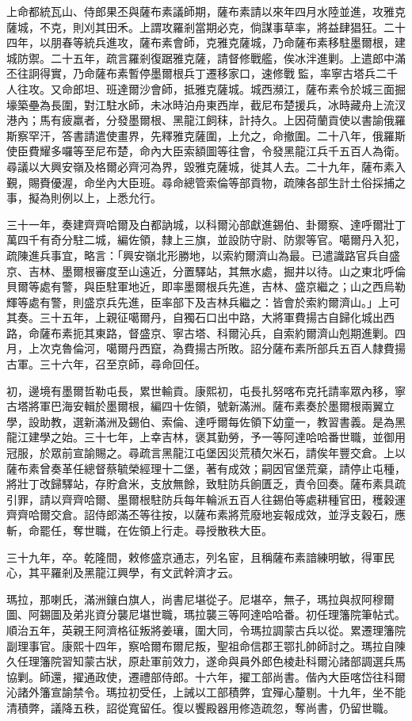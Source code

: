 \begin{pinyinscope}
上命都統瓦山、侍郎果丕與薩布素議師期，薩布素請以來年四月水陸並進，攻雅克薩城，不克，則刈其田禾。上謂攻羅剎當期必克，倘謀事草率，將益肆猖狂。二十四年，以朋春等統兵進攻，薩布素會師，克雅克薩城，乃命薩布素移駐墨爾根，建城防禦。二十五年，疏言羅剎復踞雅克薩，請督修戰艦，俟冰泮進剿。上遣郎中滿丕往詗得實，乃命薩布素暫停墨爾根兵丁遷移家口，速修戰監，率寧古塔兵二千人往攻。又命郎坦、班達爾沙會師，抵雅克薩城。城西瀕江，薩布素令於城三面掘壕築壘為長圍，對江駐水師，未冰時泊舟東西岸，截尼布楚援兵，冰時藏舟上流汊港內；馬有疲羸者，分發墨爾根、黑龍江飼秣，計持久。上因荷蘭貢使以書諭俄羅斯察罕汗，答書請遣使畫界，先釋雅克薩圍，上允之，命撤圍。二十八年，俄羅斯使臣費耀多囉等至尼布楚，命內大臣索額圖等往會，令發黑龍江兵千五百人為衛。尋議以大興安嶺及格爾必齊河為界，毀雅克薩城，徙其人去。二十九年，薩布素入覲，賜賚優渥，命坐內大臣班。尋命總管索倫等部貢物，疏陳各部生計土俗採捕之事，擬為則例以上，上悉允行。

三十一年，奏建齊齊哈爾及白都訥城，以科爾沁部獻進錫伯、卦爾察、達呼爾壯丁萬四千有奇分駐二城，編佐領，隸上三旗，並設防守尉、防禦等官。噶爾丹入犯，疏陳進兵事宜，略言：「興安嶺北形勝地，以索約爾濟山為最。已遣識路官兵自盛京、吉林、墨爾根審度至山遠近，分置驛站，其無水處，掘井以待。山之東北呼倫貝爾等處有警，與臣駐軍地近，即率墨爾根兵先進，吉林、盛京繼之；山之西烏勒輝等處有警，則盛京兵先進，臣率部下及吉林兵繼之：皆會於索約爾濟山。」上可其奏。三十五年，上親征噶爾丹，自獨石口出中路，大將軍費揚古自歸化城出西路，命薩布素扼其東路，督盛京、寧古塔、科爾沁兵，自索約爾濟山剋期進剿。四月，上次克魯倫河，噶爾丹西竄，為費揚古所敗。詔分薩布素所部兵五百人隸費揚古軍。三十六年，召至京師，尋命回任。

初，邊境有墨爾哲勒屯長，累世輸貢。康熙初，屯長扎努喀布克托請率眾內移，寧古塔將軍巴海安輯於墨爾根，編四十佐領，號新滿洲。薩布素奏於墨爾根兩翼立學，設助教，選新滿洲及錫伯、索倫、達呼爾每佐領下幼童一，教習書義。是為黑龍江建學之始。三十七年，上幸吉林，褒其勤勞，予一等阿達哈哈番世職，並御用冠服，於眾前宣諭賜之。尋疏言黑龍江屯堡因災荒積欠米石，請俟年豐交倉。上以薩布素曾奏革任總督蔡毓榮經理十二堡，著有成效；嗣因官堡荒棄，請停止屯種，將壯丁改歸驛站，存貯倉米，支放無餘，致駐防兵餉匱乏，責令回奏。薩布素具疏引罪，請以齊齊哈爾、墨爾根駐防兵每年輪派五百人往錫伯等處耕種官田，穫穀運齊齊哈爾交倉。詔侍郎滿丕等往按，以薩布素將荒廢地妄報成效，並浮支穀石，應斬，命罷任，奪世職，在佐領上行走。尋授散秩大臣。

三十九年，卒。乾隆間，敕修盛京通志，列名宦，且稱薩布素諳練明敏，得軍民心，其平羅剎及黑龍江興學，有文武幹濟才云。

瑪拉，那喇氏，滿洲鑲白旗人，尚書尼堪從子。尼堪卒，無子，瑪拉與叔阿穆爾圖、阿錫圖及弟兆資分襲尼堪世職，瑪拉襲三等阿達哈哈番。初任理籓院筆帖式。順治五年，英親王阿濟格征叛將姜瓖，圍大同，令瑪拉調蒙古兵以從。累遷理籓院副理事官。康熙十四年，察哈爾布爾尼叛，聖祖命信郡王鄂扎帥師討之。瑪拉自陳久任理籓院習知蒙古狀，原赴軍前效力，遂命與員外郎色棱赴科爾沁諸部調選兵馬協剿。師還，擢通政使，遷禮部侍郎。十六年，擢工部尚書。偕內大臣喀岱往科爾沁諸外籓宣諭禁令。瑪拉初受任，上誡以工部積弊，宜殫心釐剔。十九年，坐不能清積弊，議降五秩，詔從寬留任。復以饗殿器用修造疏忽，奪尚書，仍留世職。


\end{pinyinscope}
